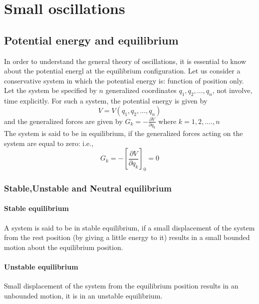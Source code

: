 \chapter{Small oscillations}
\section{Potential energy and equilibrium}
In order to understand the general theory of oscillations, it is essential to know about the potential energl at the equilibrium configuration. Let us consider a conservative system in which the potential energy is: function of position only. Let the system be specified by $n$ generalized coordinates $q_{1}, q_{2}, \ldots, q_{n}$, not involve, time explicitly. For such a system, the potential energy is given by
$$
V=V\left(q_{1}, q_{2}, \ldots, q_{n}\right)
$$
and the generalized forces are given by
$G_{k}=-\frac{\partial V}{\partial q_{k}}$ where $k=1,2, \ldots ., n$\\
The system is said to be in equilibrium, if the generalized forces acting on the system are equal to zero: i.e.,
$$
G_{k}=-\left[\frac{\partial V}{\partial q_{k}}\right]_{0}=0
$$
\subsection{Stable,Unstable and Neutral equilibrium}
\subsubsection{Stable equilibrium}
A system is said to be in stable equilibrium, if a small displacement of the system from the rest position (by giving a little energy to it) results in a small bounded motion about the equilibrium position.
\subsubsection{Unstable equilibrium}
Small displacement of the system from the equilibrium position results in an unbounded motion, it is in an unstable equilibrium.

